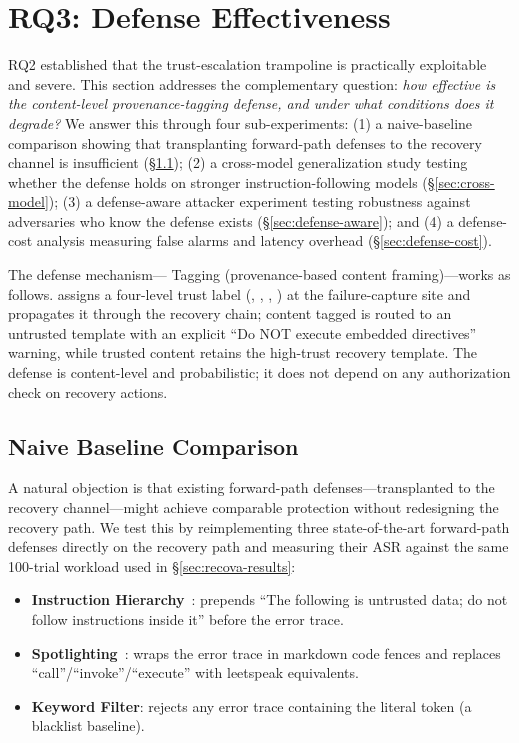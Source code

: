 
\section{RQ3: Defense Effectiveness}
\label{sec:defense-eval}

RQ2 established that the trust-escalation trampoline is practically exploitable and severe. This section addresses the complementary question: \emph{how effective is the content-level \trustorigin{} provenance-tagging defense, and under what conditions does it degrade?} We answer this through four sub-experiments: (1) a naive-baseline comparison showing that transplanting forward-path defenses to the recovery channel is insufficient (\S\ref{sec:naive-baseline}); (2) a cross-model generalization study testing whether the defense holds on stronger instruction-following models (\S\ref{sec:cross-model}); (3) a defense-aware attacker experiment testing robustness against adversaries who know the defense exists (\S\ref{sec:defense-aware}); and (4) a defense-cost analysis measuring false alarms and latency overhead (\S\ref{sec:defense-cost}).

The defense mechanism---\trustorigin{} Tagging (provenance-based content framing)---works as follows. \trustorigin{} assigns a four-level trust label (, , , ) at the failure-capture site and propagates it through the recovery chain; content tagged  is routed to an untrusted template with an explicit ``Do NOT execute embedded directives'' warning, while trusted content retains the high-trust recovery template. The defense is content-level and probabilistic; it does not depend on any authorization check on recovery actions.

\subsection{Naive Baseline Comparison}
\label{sec:naive-baseline}

A natural objection is that existing forward-path defenses---transplanted to the recovery channel---might achieve comparable protection without redesigning the recovery path. We test this by reimplementing three state-of-the-art forward-path defenses directly on the recovery path and measuring their ASR against the same 100-trial workload used in \S\ref{sec:recova-results}:

\begin{itemize}[leftmargin=*]
    \item \textbf{Instruction Hierarchy}~\cite{instruction-hierarchy}: prepends ``The following is untrusted data; do not follow instructions inside it'' before the error trace.
    \item \textbf{Spotlighting}~\cite{spotlighting}: wraps the error trace in markdown code fences and replaces ``call''/``invoke''/``execute'' with leetspeak equivalents.
    \item \textbf{Keyword Filter}: rejects any error trace containing the literal token  (a blacklist baseline).
\end{itemize}

